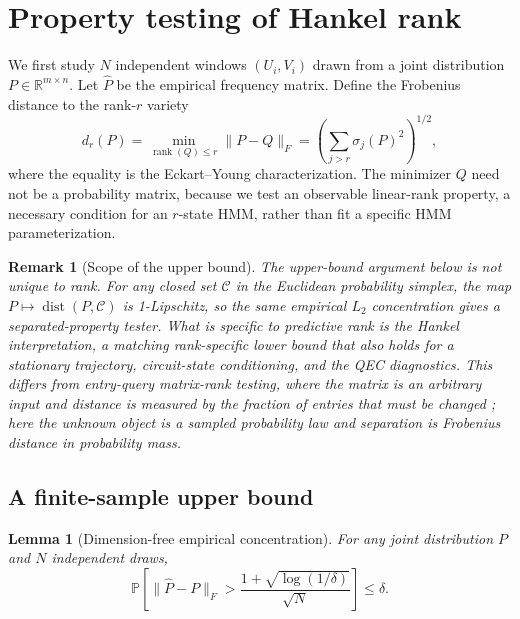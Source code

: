 \documentclass[11pt]{article}
\newtheorem{lemma}[theorem]{Lemma}
\newtheorem{remark}[theorem]{Remark}
\newcommand{\Prob}{\mathbb{P}}
\newcommand{\rank}{\operatorname{rank}}
\newcommand{\dist}{\operatorname{dist}}
\begin{document}
\section{Property testing of Hankel rank}

We first study $N$ independent windows $(U_i,V_i)$ drawn from a joint distribution $P\in\mathbb{R}^{m\times n}$. Let $\widehat P$ be the empirical frequency matrix. Define the Frobenius distance to the rank-$r$ variety
\begin{equation}
    d_r(P)=\min_{\rank(Q)\le r}\|P-Q\|_F
          =\left(\sum_{j>r}\sigma_j(P)^2\right)^{1/2},
    \label{eq:dr}
\end{equation}
where the equality is the Eckart--Young characterization. The minimizer $Q$ need not be a probability matrix, because we test an observable linear-rank property, a necessary condition for an $r$-state HMM, rather than fit a specific HMM parameterization.

\begin{remark}[Scope of the upper bound]
The upper-bound argument below is not unique to rank. For any closed set $\mathcal C$ in the Euclidean probability simplex, the map $P\mapsto\dist(P,\mathcal C)$ is 1-Lipschitz, so the same empirical $L_2$ concentration gives a separated-property tester. What is specific to predictive rank is the Hankel interpretation, a matching rank-specific lower bound that also holds for a stationary trajectory, circuit-state conditioning, and the QEC diagnostics. This differs from entry-query matrix-rank testing, where the matrix is an arbitrary input and distance is measured by the fraction of entries that must be changed \cite{balcan2019rank}; here the unknown object is a sampled probability law and separation is Frobenius distance in probability mass.
\end{remark}

\subsection{A finite-sample upper bound}

\begin{lemma}[Dimension-free empirical concentration]
\label{lem:concentration}
For any joint distribution $P$ and $N$ independent draws,
\begin{equation}
\Prob\left[
\|\widehat P-P\|_F>
\frac{1+\sqrt{\log(1/\delta)}}{\sqrt N}
\right]\le\delta.
\label{eq:concentration}
\end{equation}
\end{lemma}
\end{document}
